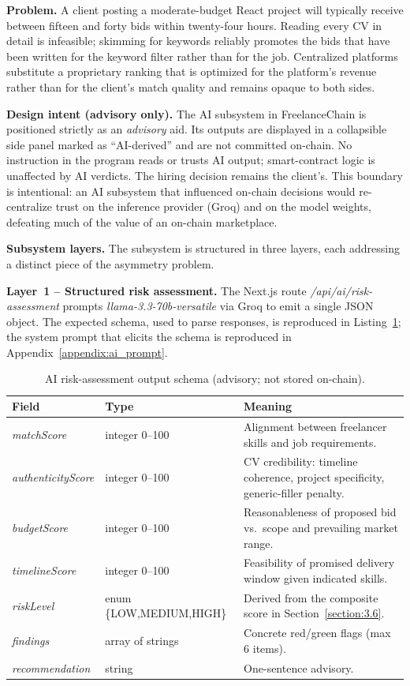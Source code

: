 \textbf{Problem.} A client posting a moderate-budget React project will typically receive between fifteen and forty bids within twenty-four hours. Reading every CV in detail is infeasible; skimming for keywords reliably promotes the bids that have been written for the keyword filter rather than for the job. Centralized platforms substitute a proprietary ranking that is optimized for the platform's revenue rather than for the client's match quality and remains opaque to both sides.

\textbf{Design intent (advisory only).} The AI subsystem in FreelanceChain is positioned strictly as an \emph{advisory} aid. Its outputs are displayed in a collapsible side panel marked as ``AI-derived'' and are not committed on-chain. No instruction in the program reads or trusts AI output; smart-contract logic is unaffected by AI verdicts. The hiring decision remains the client's. This boundary is intentional: an AI subsystem that influenced on-chain decisions would re-centralize trust on the inference provider (Groq) and on the model weights, defeating much of the value of an on-chain marketplace.

\textbf{Subsystem layers.} The subsystem is structured in three layers, each addressing a distinct piece of the asymmetry problem.

\textbf{Layer~1 -- Structured risk assessment.} The Next.js route \emph{/api/ai/risk-assessment} prompts \emph{llama-3.3-70b-versatile} via Groq to emit a single JSON object. The expected schema, used to parse responses, is reproduced in Listing~\ref{lst:ai_schema}; the system prompt that elicits the schema is reproduced in Appendix~\ref{appendix:ai_prompt}.

\begin{table}[H]
\centering
\caption{AI risk-assessment output schema (advisory; not stored on-chain).}
\label{lst:ai_schema}
\small
\begin{tabular}{|l|l|p{6.5cm}|}
\hline
\textbf{Field} & \textbf{Type} & \textbf{Meaning} \\ \hline
\emph{matchScore} & integer 0--100 & Alignment between freelancer skills and job requirements. \\ \hline
\emph{authenticityScore} & integer 0--100 & CV credibility: timeline coherence, project specificity, generic-filler penalty. \\ \hline
\emph{budgetScore} & integer 0--100 & Reasonableness of proposed bid vs.\ scope and prevailing market range. \\ \hline
\emph{timelineScore} & integer 0--100 & Feasibility of promised delivery window given indicated skills. \\ \hline
\emph{riskLevel} & enum \{LOW,MEDIUM,HIGH\} & Derived from the composite score in Section~\ref{section:3.6}. \\ \hline
\emph{findings} & array of strings & Concrete red/green flags (max 6 items). \\ \hline
\emph{recommendation} & string & One-sentence advisory. \\ \hline
\end{tabular}
\end{table}

